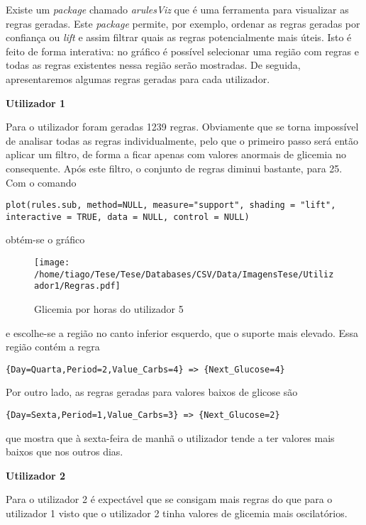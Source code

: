 Existe um \textit{package} chamado \textit{arulesViz} que é uma ferramenta para visualizar as regras geradas. Este \textit{package} permite, por exemplo, ordenar as regras geradas por confiança ou \textit{lift} e assim filtrar quais as regras potencialmente mais úteis. Isto é feito de forma interativa: no gráfico é possível selecionar uma região com regras e todas as regras existentes nessa região serão mostradas.
De seguida, apresentaremos algumas regras geradas para cada utilizador.

\textbf{Utilizador 1}

Para o utilizador foram geradas 1239 regras. Obviamente que se torna impossível de analisar todas as regras individualmente, pelo que o primeiro passo será então aplicar um filtro, de forma a ficar apenas com valores anormais de glicemia no consequente. Após este filtro, o conjunto de regras diminui bastante, para 25. Com o comando

\begin{lstlisting}
plot(rules.sub, method=NULL, measure="support", shading = "lift", interactive = TRUE, data = NULL, control = NULL)
\end{lstlisting}

obtém-se o gráfico

\begin{figure}[H]
\centering
\texttt{[image: /home/tiago/Tese/Tese/Databases/CSV/Data/ImagensTese/Utilizador1/Regras.pdf]}
\caption{Glicemia por horas do utilizador 5}
\end{figure}

e escolhe-se a região no canto inferior esquerdo, que o suporte mais elevado. Essa região contém a regra

\begin{lstlisting}
{Day=Quarta,Period=2,Value_Carbs=4} => {Next_Glucose=4}

\end{lstlisting}

Por outro lado, as regras geradas para valores baixos de glicose são

\begin{lstlisting}
{Day=Sexta,Period=1,Value_Carbs=3} => {Next_Glucose=2}
\end{lstlisting}

que mostra que à sexta-feira de manhã o utilizador tende a ter valores mais baixos que nos outros dias.


\textbf{Utilizador 2}

Para o utilizador 2 é expectável que se consigam mais regras do que para o utilizador 1 visto que o utilizador 2 tinha valores de glicemia mais oscilatórios. 

